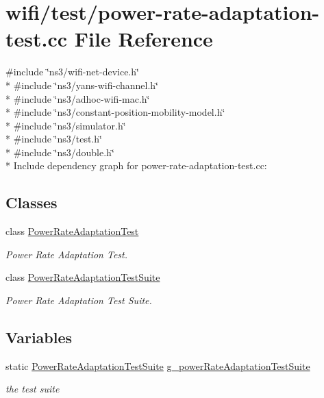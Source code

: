 \hypertarget{power-rate-adaptation-test_8cc}{}\section{wifi/test/power-\/rate-\/adaptation-\/test.cc File Reference}
\label{power-rate-adaptation-test_8cc}
{\ttfamily \#include \char`\"{}ns3/wifi-\/net-\/device.\+h\char`\"{}}\\*
{\ttfamily \#include \char`\"{}ns3/yans-\/wifi-\/channel.\+h\char`\"{}}\\*
{\ttfamily \#include \char`\"{}ns3/adhoc-\/wifi-\/mac.\+h\char`\"{}}\\*
{\ttfamily \#include \char`\"{}ns3/constant-\/position-\/mobility-\/model.\+h\char`\"{}}\\*
{\ttfamily \#include \char`\"{}ns3/simulator.\+h\char`\"{}}\\*
{\ttfamily \#include \char`\"{}ns3/test.\+h\char`\"{}}\\*
{\ttfamily \#include \char`\"{}ns3/double.\+h\char`\"{}}\\*
Include dependency graph for power-\/rate-\/adaptation-\/test.cc\+:
\subsection*{Classes}
\begin{DoxyCompactItemize}
\item 
class \hyperlink{classPowerRateAdaptationTest}{Power\+Rate\+Adaptation\+Test}
\begin{DoxyCompactList}\small\item\em Power Rate Adaptation Test. \end{DoxyCompactList}\item 
class \hyperlink{classPowerRateAdaptationTestSuite}{Power\+Rate\+Adaptation\+Test\+Suite}
\begin{DoxyCompactList}\small\item\em Power Rate Adaptation Test Suite. \end{DoxyCompactList}\end{DoxyCompactItemize}
\subsection*{Variables}
\begin{DoxyCompactItemize}
\item 
static \hyperlink{classPowerRateAdaptationTestSuite}{Power\+Rate\+Adaptation\+Test\+Suite} \hyperlink{power-rate-adaptation-test_8cc_a40560e2836cc5faa9ee4476b16125715}{g\+\_\+power\+Rate\+Adaptation\+Test\+Suite}
\begin{DoxyCompactList}\small\item\em the test suite \end{DoxyCompactList}\end{DoxyCompactItemize}


